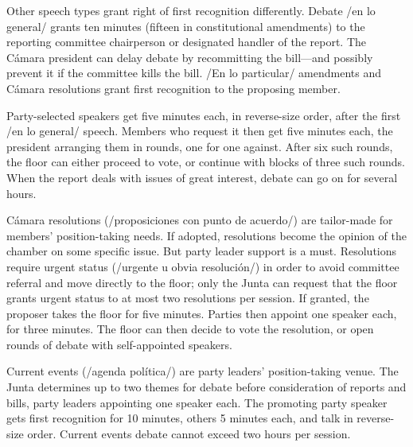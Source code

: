 \documentclass[letter,12pt]{article}
\begin{document}
Other speech types grant right of first recognition differently. Debate /en lo general/ grants ten minutes (fifteen in constitutional amendments) to the reporting committee chairperson or designated handler of the report. The Cámara president can delay debate by recommitting the bill---and possibly prevent it if the committee kills the bill. /En lo particular/ amendments and Cámara resolutions grant first recognition to the proposing member. 

Party-selected speakers get five minutes each, in reverse-size order, after the first /en lo general/ speech. Members who request it then get five minutes each, the president arranging them in rounds, one for one against. After six such rounds, the floor can either proceed to vote, or continue with blocks of three such rounds. When the report deals with issues of great interest, debate can go on for several hours.




Cámara resolutions (/proposiciones con punto de acuerdo/) are tailor-made for members' position-taking needs. If adopted, resolutions become the opinion of the chamber on some specific issue. But party leader support is a must. Resolutions require urgent status (/urgente u obvia resolución/) in order to avoid committee referral and move directly to the floor; only the Junta can request that the floor grants urgent status to at most two resolutions per session. If granted, the proposer takes the floor for five minutes. Parties then appoint one speaker each, for three minutes. The floor can then decide to vote the resolution, or open rounds of debate with self-appointed speakers.

Current events (/agenda política/) are party leaders' position-taking venue. The Junta determines up to two themes for debate before consideration of reports and bills, party leaders appointing one speaker each. The promoting party speaker gets first recognition for 10 minutes, others 5 minutes each, and talk in reverse-size order. Current events debate cannot exceed two hours per session. 
\end{document}
